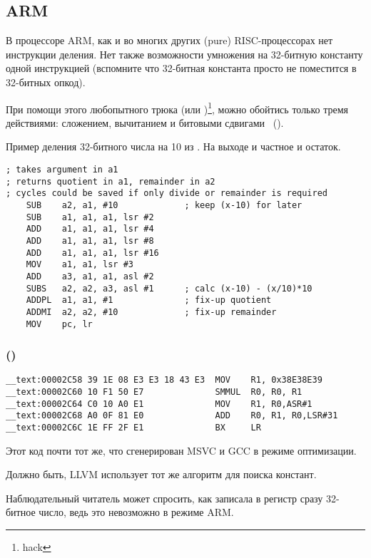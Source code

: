 ﻿\subsection{ARM}

В процессоре ARM, как и во многих других  (pure) RISC-процессорах нет инструкции деления.
Нет также возможности умножения на 32-битную константу одной инструкцией (вспомните что 32-битная
константа просто не поместится в 32-битных опкод).

При помощи этого любопытного трюка (или )\footnote{hack}, можно обойтись только тремя действиями: 
сложением, вычитанием и битовыми сдвигами
~().

Пример деления 32-битного числа на 10 из
.
На выходе и частное и остаток.

\begin{lstlisting}[style=customasmARM]
; takes argument in a1
; returns quotient in a1, remainder in a2
; cycles could be saved if only divide or remainder is required
    SUB    a2, a1, #10             ; keep (x-10) for later
    SUB    a1, a1, a1, lsr #2
    ADD    a1, a1, a1, lsr #4
    ADD    a1, a1, a1, lsr #8
    ADD    a1, a1, a1, lsr #16
    MOV    a1, a1, lsr #3
    ADD    a3, a1, a1, asl #2
    SUBS   a2, a2, a3, asl #1      ; calc (x-10) - (x/10)*10
    ADDPL  a1, a1, #1              ; fix-up quotient
    ADDMI  a2, a2, #10             ; fix-up remainder
    MOV    pc, lr
\end{lstlisting}

\subsubsection{\OptimizingXcodeIV (\ARMMode)}

\begin{lstlisting}[style=customasmARM]
__text:00002C58 39 1E 08 E3 E3 18 43 E3  MOV    R1, 0x38E38E39
__text:00002C60 10 F1 50 E7              SMMUL  R0, R0, R1
__text:00002C64 C0 10 A0 E1              MOV    R1, R0,ASR#1
__text:00002C68 A0 0F 81 E0              ADD    R0, R1, R0,LSR#31
__text:00002C6C 1E FF 2F E1              BX     LR
\end{lstlisting}

Этот код почти тот же, что сгенерирован MSVC и GCC в режиме оптимизации.

Должно быть, LLVM использует тот же алгоритм для поиска констант.

Наблюдательный читатель может спросить, как \MOV записала в регистр сразу 32-битное число, 
ведь это невозможно в режиме ARM.

